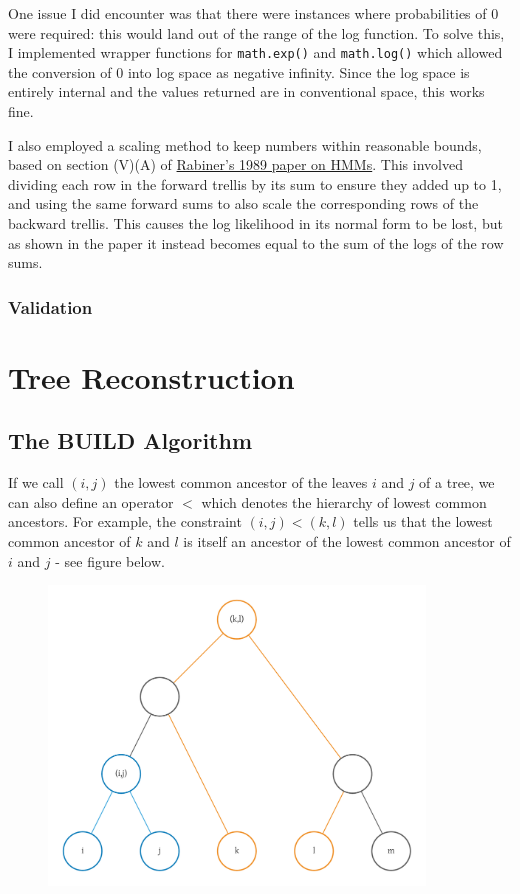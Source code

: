 \documentclass[11pt]{article} %
\begin{document}
One issue I did encounter was that there were instances where probabilities of 0 were required: this would land out of the range of the log function. To solve this, I implemented wrapper functions for \texttt{math.exp()} and \texttt{math.log()} which allowed the conversion of 0 into log space as negative infinity. Since the log space is entirely internal and the values returned are in conventional space, this works fine.

I also employed a scaling method to keep numbers within reasonable bounds, based on section (V)(A) of \href{http://dx.doi.org/10.1109/5.18626}{Rabiner's 1989 paper on HMMs}. This involved dividing each row in the forward trellis by its sum to ensure they added up to 1, and using the same forward sums to also scale the corresponding rows of the backward trellis. This causes the log likelihood in its normal form to be lost, but as shown in the paper it instead becomes equal to the sum of the logs of the row sums.

\subsubsection{Validation}


\hfill

\hfill


\section{Tree Reconstruction}

\subsection{The BUILD Algorithm}
If we call $(i,j)$ the lowest common ancestor of the leaves $i$ and $j$ of a tree, we can also define an operator $<$ which denotes the hierarchy of lowest common ancestors. For example, the constraint $(i,j)<(k,l)$ tells us that the lowest common ancestor of $k$ and $l$ is itself an ancestor of the lowest common ancestor of $i$ and $j$ - see figure below.

\begin{figure}
	\centering
	\includegraphics[width=10cm]{buildexample}
\end{figure}
\end{document}
